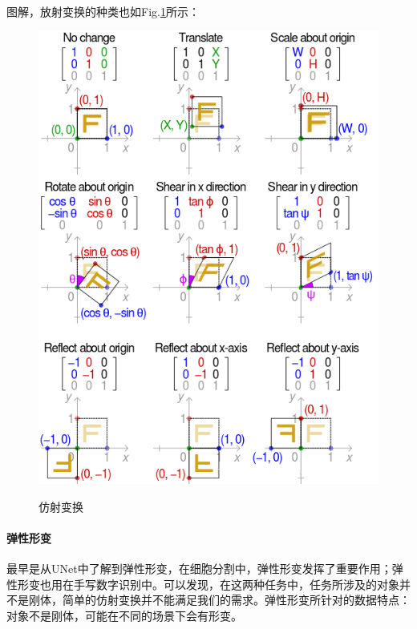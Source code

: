 图解，放射变换的种类也如Fig.\ref{fig:affine}所示：
\begin{figure}[h]
	\centering
	\includegraphics[width=.8\textwidth]{pics/affine.png}
	\label{fig:affine}
	\caption{仿射变换}
\end{figure}

\paragraph{弹性形变\cite{simard2003best}}
最早是从UNet中了解到弹性形变，在细胞分割中，弹性形变发挥了重要作用；弹性形变也用在手写数字识别中。可以发现，在这两种任务中，任务所涉及的对象并不是刚体，简单的仿射变换并不能满足我们的需求。弹性形变所针对的数据特点：对象不是刚体，可能在不同的场景下会有形变。


